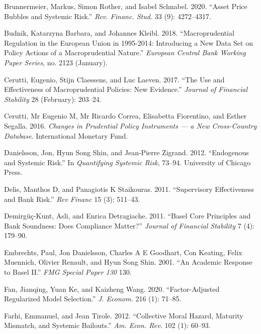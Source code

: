 \documentclass[
  10pt,
]{article}
\begin{document}
\leavevmode\hypertarget{ref-Brunnermeier2020}{}%
Brunnermeier, Markus, Simon Rother, and Isabel Schnabel. 2020. ``Asset
Price Bubbles and Systemic Risk.'' \emph{Rev. Financ. Stud.} 33 (9):
4272--4317.

\leavevmode\hypertarget{ref-Budnik2018}{}%
Budnik, Katarzyna Barbara, and Johannes Kleibl. 2018. ``Macroprudential
Regulation in the European Union in 1995-2014: Introducing a New Data
Set on Policy Actions of a Macroprudential Nature.'' \emph{European
Central Bank Working Paper Series}, no. 2123 (January).

\leavevmode\hypertarget{ref-Cerutti2017}{}%
Cerutti, Eugenio, Stijn Claessens, and Luc Laeven. 2017. ``The Use and
Effectiveness of Macroprudential Policies: New Evidence.'' \emph{Journal
of Financial Stability} 28 (February): 203--24.

\leavevmode\hypertarget{ref-Cerutti2016}{}%
Cerutti, Mr Eugenio M, Mr Ricardo Correa, Elisabetta Fiorentino, and
Esther Segalla. 2016. \emph{Changes in Prudential Policy Instruments ---
a New Cross-Country Database}. International Monetary Fund.

\leavevmode\hypertarget{ref-Danielsson2012}{}%
Danielsson, Jon, Hyun Song Shin, and Jean-Pierre Zigrand. 2012.
``Endogenous and Systemic Risk.'' In \emph{Quantifying Systemic Risk},
73--94. University of Chicago Press.

\leavevmode\hypertarget{ref-Delis2011}{}%
Delis, Manthos D, and Panagiotis K Staikouras. 2011. ``Supervisory
Effectiveness and Bank Risk.'' \emph{Rev Financ} 15 (3): 511--43.

\leavevmode\hypertarget{ref-Demirguc-Kunt2011}{}%
Demirgüç-Kunt, Asli, and Enrica Detragiache. 2011. ``Basel Core
Principles and Bank Soundness: Does Compliance Matter?'' \emph{Journal
of Financial Stability} 7 (4): 179--90.

\leavevmode\hypertarget{ref-Embrechts2001}{}%
Embrechts, Paul, Jon Danielsson, Charles A E Goodhart, Con Keating,
Felix Muennich, Olivier Renault, and Hyun Song Shin. 2001. ``An Academic
Response to Basel II.'' \emph{FMG Special Paper 130} 130.

\leavevmode\hypertarget{ref-Fan2020}{}%
Fan, Jianqing, Yuan Ke, and Kaizheng Wang. 2020. ``Factor-Adjusted
Regularized Model Selection.'' \emph{J. Econom.} 216 (1): 71--85.

\leavevmode\hypertarget{ref-Farhi2012}{}%
Farhi, Emmanuel, and Jean Tirole. 2012. ``Collective Moral Hazard,
Maturity Mismatch, and Systemic Bailouts.'' \emph{Am. Econ. Rev.} 102
(1): 60--93.
\end{document}

